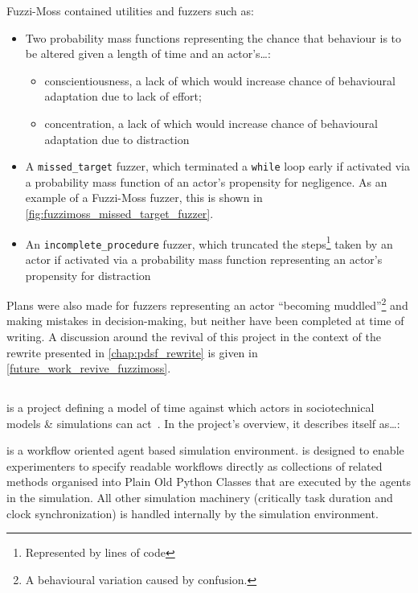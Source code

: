 Fuzzi-Moss contained utilities and fuzzers such as:

\begin{itemize}
    \item Two probability mass functions representing the chance that
    behaviour is to be altered given a length of time and an actor's\ldots{}:
    \begin{itemize}
        \item conscientiousness, a lack of which would increase chance of behavioural adaptation due to lack
    of effort;
        \item concentration, a lack of which would increase chance of behavioural
    adaptation due to distraction
    \end{itemize}
    \item A \lstinline{missed_target} fuzzer, which terminated a
    \lstinline{while} loop early if activated via a probability mass function of
    an actor's propensity for negligence. As an example of a Fuzzi-Moss fuzzer,
    this is shown in \cref{fig:fuzzimoss_missed_target_fuzzer}.
    \item An \lstinline{incomplete_procedure} fuzzer, which truncated the
    steps\footnote{Represented by lines of code} taken by an actor if activated
    via a probability mass function representing an actor's propensity for
    distraction
\end{itemize}

Plans were also made for fuzzers representing an actor ``becoming
muddled''\footnote{A behavioural variation caused by confusion.} and making
mistakes in decision-making, but neither have been completed at time of writing.
A discussion around the revival of this project in the context of the \pdsf
rewrite presented in \cref{chap:pdsf_rewrite} is given in
\cref{future_work_revive_fuzzimoss}. 


\subsection{\theatreag{}}\label{subsec:prior_work_theatre}

\theatreag{} is a project defining a model of time against which actors in
sociotechnical models \& simulations can act~\cite{theatre_ag_repo}. In the
project's overview, it describes itself as\ldots{}:

\begin{blockquote}
    \theatreag{} is a workflow oriented agent based simulation environment.
    \theatreag{} is designed to enable experimenters to specify readable workflows
directly as collections of related methods organised into Plain Old Python
Classes that are executed by the agents in the simulation. All other simulation
machinery (critically task duration and clock synchronization) is handled
internally by the simulation environment.
\end{blockquote}

